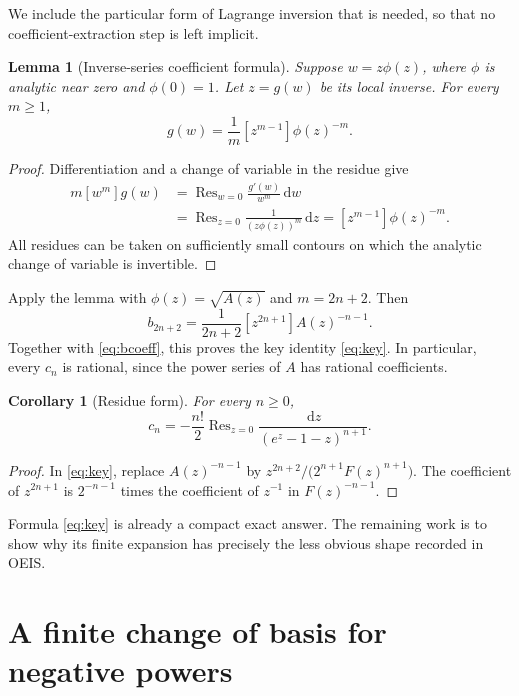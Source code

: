 \documentclass[11pt,letterpaper]{article}
\numberwithin{equation}{section}
\newtheorem{lemma}[theorem]{Lemma}
\newtheorem{corollary}[theorem]{Corollary}
\theoremstyle{remark}
\newcommand{\Res}{\operatorname{Res}}
\newcommand{\dd}{\,\mathrm{d}}
\begin{document}
We include the particular form of Lagrange inversion that is needed, so
that no coefficient-extraction step is left implicit.

\begin{lemma}[Inverse-series coefficient formula]
\label{lem:lagrange}
Suppose $w=z\phi(z)$, where $\phi$ is analytic near zero and $\phi(0)=1$.
Let $z=g(w)$ be its local inverse. For every $m\geq1$,
\begin{equation}
 [w^m]g(w)=\frac1m[z^{m-1}]\phi(z)^{-m}.
 \label{eq:lagrange}
\end{equation}
\end{lemma}

\begin{proof}
Differentiation and a change of variable in the residue give
\begin{align*}
 m[w^m]g(w)
 &=\Res_{w=0}\frac{g'(w)}{w^m}\dd w\\
 &=\Res_{z=0}\frac{1}{(z\phi(z))^m}\dd z
 =[z^{m-1}]\phi(z)^{-m}.
\end{align*}
All residues can be taken on sufficiently small contours on which the
analytic change of variable is invertible.
\end{proof}

Apply the lemma with $\phi(z)=\sqrt{A(z)}$ and $m=2n+2$. Then
\[
 b_{2n+2}
 =\frac1{2n+2}[z^{2n+1}]A(z)^{-n-1}.
\]
Together with \eqref{eq:bcoeff}, this proves the key identity
\eqref{eq:key}. In particular, every $c_n$ is rational, since the
power series of $A$ has rational coefficients.

\begin{corollary}[Residue form]
\label{cor:residue}
For every $n\geq0$,
\begin{equation}
 c_n=-\frac{n!}{2}\Res_{z=0}
             \frac{\dd z}{(e^z-1-z)^{n+1}}.
 \label{eq:residue}
\end{equation}
\end{corollary}
\begin{proof}
In \eqref{eq:key}, replace $A(z)^{-n-1}$ by
$z^{2n+2}/\bigl(2^{n+1}F(z)^{n+1}\bigr)$. The coefficient of $z^{2n+1}$
is $2^{-n-1}$ times the coefficient of $z^{-1}$ in $F(z)^{-n-1}$.
\end{proof}

Formula \eqref{eq:key} is already a compact exact answer. The remaining
work is to show why its finite expansion has precisely the less obvious
shape recorded in OEIS.

\section{A finite change of basis for negative powers}
\label{sec:finite}
\end{document}
